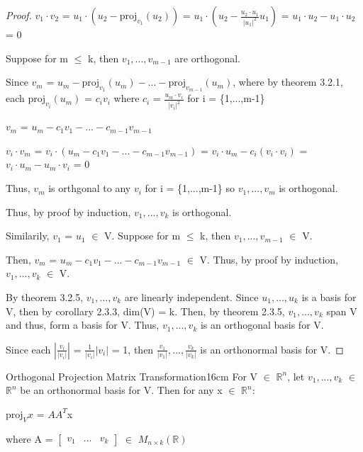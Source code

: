     \begin{proof}
        $v_1 \cdot v_2$
        = $u_1 \cdot (u_2 - \text{proj}_{v_1}(u_2))$
        = $u_1 \cdot (u_2 - \frac{u_2 \cdot u_1}{|u_1|^2}u_1)$
        = $u_1 \cdot u_2 - u_1 \cdot u_2$
        = 0

        Suppose for m $\leq$ k, then $v_1,...,v_{m-1}$ are orthogonal.

        Since $v_m$ =
        $u_m - \text{proj}_{v_1}(u_m) - ... - \text{proj}_{v_{m-1}}(u_m)$, where
        by {\color{red} theorem 3.2.1}, each
        $\text{proj}_{v_i}(u_m)$ = $c_iv_i$
        where $c_i$ = $\frac{u_m \cdot v_i}{|v_i|^2}$
        for i = \{1,...,m-1\}

        \hspace{0.5cm}
        $v_m$ = $u_m - c_1v_1 - ... - c_{m-1}v_{m-1}$

        \hspace{0.5cm}
        $v_i \cdot v_m$
        = $v_i \cdot (u_m - c_1v_1 - ... - c_{m-1}v_{m-1})$
        = $v_i \cdot u_m - c_i(v_i \cdot v_i)$
        = $v_i \cdot u_m - u_m \cdot v_i$
        = 0

        Thus, $v_m$ is orthgonal to any $v_i$ for i = \{1,...,m-1\}
        so $v_1,...,v_m$ is orthogonal.

        Thus, by proof by induction, $v_1,...,v_k$ is orthogonal.
        
        Similarily, $v_1$ = $u_1$ $\in$ V.
        Suppose for m $\leq$ k, then $v_1,...,v_{m-1}$ $\in$ V.

        Then, $v_m$ = $u_m - c_1v_1 - ... - c_{m-1}v_{m-1}$ $\in$ V.
        Thus, by proof by induction, $v_1,...,v_k$ $\in$ V.

        By {\color{red} theorem 3.2.5}, $v_1,...,v_k$
        are linearly independent. Since $u_1,...,u_k$ is a basis for V,
        then by {\color{orange} corollary 2.3.3}, dim(V) = k.
        Then, by {\color{red} theorem 2.3.5}, $v_1,...,v_k$
        span V and thus, form a basis for V.
        Thus, $v_1,...,v_k$ is an orthogonal basis for V.

        Since each $|\frac{v_i}{|v_i|}|$ = $\frac{1}{|v_i|}|v_i|$ = 1,
        then $\frac{v_1}{|v_1|},...,\frac{v_k}{|v_k|}$ is an orthonormal
        basis for V.
    \end{proof}

    \vspace{0.5cm}



    \begin{wtheorem}{Orthogonal Projection Matrix Transformation}{16cm}
        For V $\in$ $\mathbb{R}^n$, let $v_1,...,v_k$ $\in$ $\mathbb{R}^n$
        be an orthonormal basis for V. Then for any x $\in$ $\mathbb{R}^n$:

        \hspace{0.5cm}
        $\text{proj}_Vx$ = $AA^T$x

        where A =
        $\begin{bmatrix}
            v_1 & ... & v_k
        \end{bmatrix}$
        $\in$ $M_{n \times k}(\mathbb{R})$
    \end{wtheorem}

